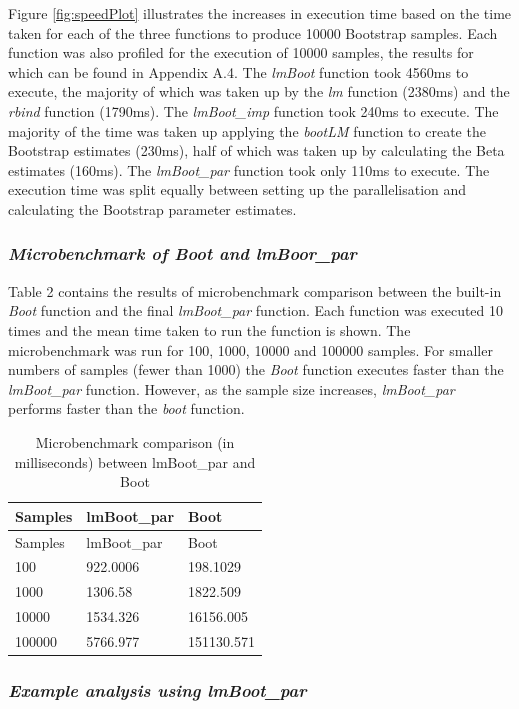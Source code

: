 \documentclass[]{article}
\begin{document}
Figure \ref{fig:speedPlot} illustrates the increases in execution time
based on the time taken for each of the three functions to produce 10000
Bootstrap samples. Each function was also profiled for the execution of
10000 samples, the results for which can be found in Appendix A.4. The
\emph{lmBoot} function took 4560ms to execute, the majority of which was
taken up by the \emph{lm} function (2380ms) and the \emph{rbind}
function (1790ms). The \emph{lmBoot\_imp} function took 240ms to
execute. The majority of the time was taken up applying the
\emph{bootLM} function to create the Bootstrap estimates (230ms), half
of which was taken up by calculating the Beta estimates (160ms). The
\emph{lmBoot\_par} function took only 110ms to execute. The execution
time was split equally between setting up the parallelisation and
calculating the Bootstrap parameter estimates.

\subsubsection{\texorpdfstring{\emph{Microbenchmark of Boot and
lmBoor\_par}}{Microbenchmark of Boot and lmBoor\_par}}\label{microbenchmark-of-boot-and-lmboor_par}

Table 2 contains the results of microbenchmark comparison between the
built-in \emph{Boot} function and the final \emph{lmBoot\_par} function.
Each function was executed 10 times and the mean time taken to run the
function is shown. The microbenchmark was run for 100, 1000, 10000 and
100000 samples. For smaller numbers of samples (fewer than 1000) the
\emph{Boot} function executes faster than the \emph{lmBoot\_par}
function. However, as the sample size increases, \emph{lmBoot\_par}
performs faster than the \emph{boot} function.

\begin{longtable}[]{@{}lll@{}}
\caption{Microbenchmark comparison (in milliseconds) between lmBoot\_par
and Boot}\tabularnewline
\toprule
Samples & lmBoot\_par & Boot\tabularnewline
\midrule
\endfirsthead
\toprule
Samples & lmBoot\_par & Boot\tabularnewline
\midrule
\endhead
100 & 922.0006 & 198.1029\tabularnewline
1000 & 1306.58 & 1822.509\tabularnewline
10000 & 1534.326 & 16156.005\tabularnewline
100000 & 5766.977 & 151130.571\tabularnewline
\bottomrule
\end{longtable}

\subsubsection{\texorpdfstring{\emph{Example analysis using
lmBoot\_par}}{Example analysis using lmBoot\_par}}\label{example-analysis-using-lmboot_par}
\end{document}
